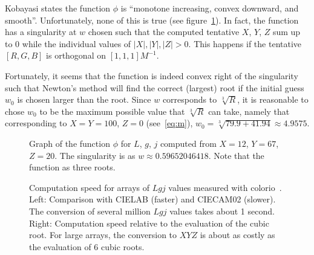 \documentclass{scrartcl}
\theoremstyle{named}
\begin{document}
Kobayasi states the function $\phi$ is ``monotone increasing, convex downward, and
smooth''. Unfortunately, none of this is true (see figure~\ref{fig:singularity}). In
fact, the function has a singularity at $w$ chosen such that the computed tentative
$X$, $Y$, $Z$ sum up to 0 while the individual values of $|X|, |Y|, |Z| > 0$. This
happens if the tentative $[R, G, B]$ is orthogonal on $[1,1,1] M^{-1}$.

Fortunately, it seems that the function is indeed convex right of the singularity such
that Newton's method will find the correct (largest) root if the initial guess $w_0$ is
chosen larger than the root. Since $w$ corresponds to $\sqrt[3]{R}$, it is
reasonable to chose $w_0$ to be the maximum possible value that $\sqrt[3]{R}$ can take,
namely that corresponding to $X=Y=100$, $Z=0$ (see~\ref{eq:m}), $w_0=\sqrt[3]{79.9 +
41.94}\approx 4.9575$.

\begin{figure}
  \centering
  
  \caption{Graph of the function $\phi$ for $L$, $g$, $j$ computed from $X=12$, $Y=67$,
  $Z=20$. The singularity is as $w\approx 0.59652046418$. Note that the function as
  three roots.}\label{fig:singularity}
\end{figure}

\begin{figure}
  \centering
  \hfill
  
  \hfill
  
  \hfill
  \caption{Computation speed for arrays of $Lgj$ values measured with
  colorio~\cite{colorio}. Left: Comparison with CIELAB (faster) and CIECAM02 (slower).
  The conversion of several million $Lgj$ values takes about 1 second. Right:
  Computation speed relative to the evaluation of the cubic root. For large arrays, the
  conversion to $XYZ$ is about as costly as the evaluation of 6 cubic roots.}
\end{figure}

{}

\end{document}
